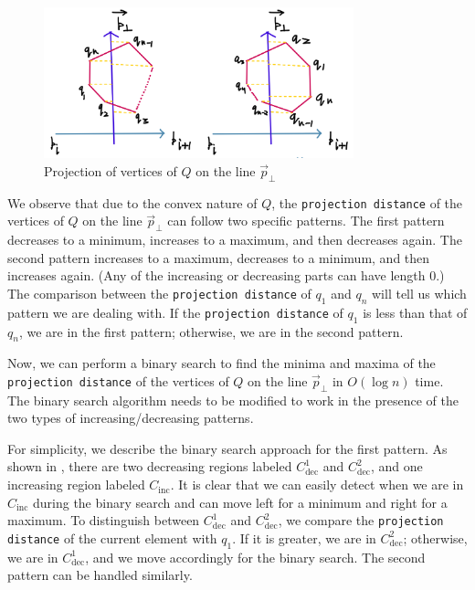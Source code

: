 \documentclass[12pt]{article}
\begin{document}
\begin{figure}[H]
    \centering
    \includegraphics[width=0.8\textwidth]{img/4.jpg}
    \caption{Projection of vertices of \( Q \) on the line \( \vec{p}_{\perp} \)}
    \label{fig:4}
\end{figure}

We observe that due to the convex nature of \( Q \), the \texttt{projection distance} of the vertices of \( Q \) on the line \( \vec{p}_{\perp} \) can follow two specific patterns. The first pattern decreases to a minimum, increases to a maximum, and then decreases again. The second pattern increases to a maximum, decreases to a minimum, and then increases again. (Any of the increasing or decreasing parts can have length 0.) The comparison between the \texttt{projection distance} of \( q_1 \) and \( q_n \) will tell us which pattern we are dealing with. If the \texttt{projection distance} of \( q_1 \) is less than that of \( q_n \), we are in the first pattern; otherwise, we are in the second pattern.

Now, we can perform a binary search to find the minima and maxima of the \texttt{projection distance} of the vertices of \( Q \) on the line \( \vec{p}_{\perp} \) in \( O(\log n) \) time. The binary search algorithm needs to be modified to work in the presence of the two types of increasing/decreasing patterns.

For simplicity, we describe the binary search approach for the first pattern. As shown in , there are two decreasing regions labeled \( C_{\text{dec}}^1 \) and \( C_{\text{dec}}^2 \), and one increasing region labeled \( C_{\text{inc}} \). It is clear that we can easily detect when we are in \( C_{\text{inc}} \) during the binary search and can move left for a minimum and right for a maximum. To distinguish between \( C_{\text{dec}}^1 \) and \( C_{\text{dec}}^2 \), we compare the \texttt{projection distance} of the current element with \( q_1 \). If it is greater, we are in \( C_{\text{dec}}^2 \); otherwise, we are in \( C_{\text{dec}}^1 \), and we move accordingly for the binary search. The second pattern can be handled similarly.
\end{document}

